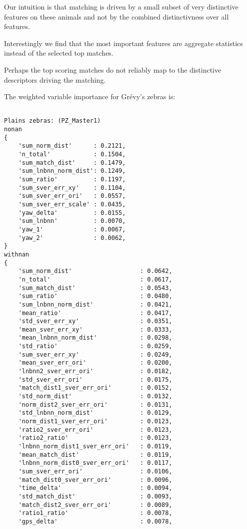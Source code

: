 Our intuition is that matching is driven by a small subset of very distinctive
  features on these animals and not by the combined distinctivness over all
  features.

Interestingly we find that the most important features are aggregate
  statistics instead of the selected top matches.

Perhaps the top scoring matches do not reliably map to the distinctive
descriptors driving the matching. 

The weighted variable importance for Grévy's zebras is: 
\begin{verbatim}

Plains zebras: (PZ_Master1)
nonan
{
    'sum_norm_dist'      : 0.2121,
    'n_total'            : 0.1504,
    'sum_match_dist'     : 0.1479,
    'sum_lnbnn_norm_dist': 0.1249,
    'sum_ratio'          : 0.1197,
    'sum_sver_err_xy'    : 0.1104,
    'sum_sver_err_ori'   : 0.0557,
    'sum_sver_err_scale' : 0.0435,
    'yaw_delta'          : 0.0155,
    'sum_lnbnn'          : 0.0070,
    'yaw_1'              : 0.0067,
    'yaw_2'              : 0.0062,
}
withnan
{
    'sum_norm_dist'                   : 0.0642,
    'n_total'                         : 0.0617,
    'sum_match_dist'                  : 0.0543,
    'sum_ratio'                       : 0.0480,
    'sum_lnbnn_norm_dist'             : 0.0421,
    'mean_ratio'                      : 0.0417,
    'std_sver_err_xy'                 : 0.0351,
    'mean_sver_err_xy'                : 0.0333,
    'mean_lnbnn_norm_dist'            : 0.0298,
    'std_ratio'                       : 0.0259,
    'sum_sver_err_xy'                 : 0.0249,
    'mean_sver_err_ori'               : 0.0200,
    'lnbnn2_sver_err_ori'             : 0.0182,
    'std_sver_err_ori'                : 0.0175,
    'match_dist1_sver_err_ori'        : 0.0152,
    'std_norm_dist'                   : 0.0132,
    'norm_dist2_sver_err_ori'         : 0.0131,
    'std_lnbnn_norm_dist'             : 0.0129,
    'norm_dist1_sver_err_ori'         : 0.0123,
    'ratio2_sver_err_ori'             : 0.0123,
    'ratio2_ratio'                    : 0.0123,
    'lnbnn_norm_dist1_sver_err_ori'   : 0.0119,
    'mean_match_dist'                 : 0.0119,
    'lnbnn_norm_dist0_sver_err_ori'   : 0.0117,
    'sum_sver_err_ori'                : 0.0106,
    'match_dist0_sver_err_ori'        : 0.0096,
    'time_delta'                      : 0.0094,
    'std_match_dist'                  : 0.0093,
    'match_dist2_sver_err_ori'        : 0.0089,
    'ratio1_ratio'                    : 0.0078,
    'gps_delta'                       : 0.0078,

\end{verbatim}
